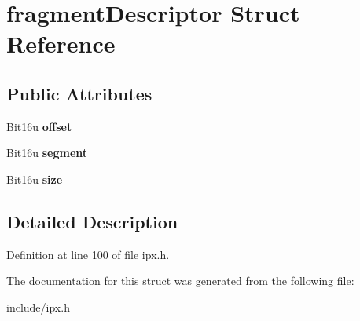 \hypertarget{structfragmentDescriptor}{\section{fragment\-Descriptor Struct Reference}
\label{structfragmentDescriptor}
}
\subsection*{Public Attributes}
\begin{DoxyCompactItemize}
\item 
\hypertarget{structfragmentDescriptor_ad65e1fb3c85e303d38cffef433f9c8a2}{Bit16u {\bfseries offset}}\label{structfragmentDescriptor_ad65e1fb3c85e303d38cffef433f9c8a2}

\item 
\hypertarget{structfragmentDescriptor_a56dfaf138517395e4cd365a42973d61b}{Bit16u {\bfseries segment}}\label{structfragmentDescriptor_a56dfaf138517395e4cd365a42973d61b}

\item 
\hypertarget{structfragmentDescriptor_a8a4293b6b7ac1b99b07ee64698463c12}{Bit16u {\bfseries size}}\label{structfragmentDescriptor_a8a4293b6b7ac1b99b07ee64698463c12}

\end{DoxyCompactItemize}


\subsection{Detailed Description}


Definition at line 100 of file ipx.\-h.



The documentation for this struct was generated from the following file\-:\begin{DoxyCompactItemize}
\item 
include/ipx.\-h\end{DoxyCompactItemize}
